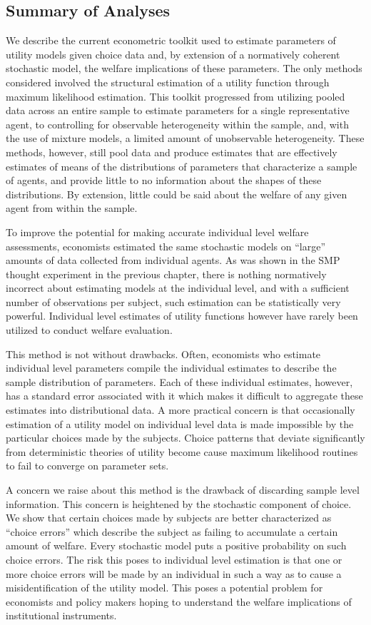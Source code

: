 \documentclass[../main.tex]{subfiles}
\begin{document}
\subsection{Summary of Analyses}

We describe the current econometric toolkit used to estimate parameters of utility models given choice data and, by extension of a normatively coherent stochastic model, the welfare implications of these parameters.
The only methods considered involved the structural estimation of a utility function through maximum likelihood estimation.
This toolkit progressed from utilizing pooled data across an entire sample to estimate parameters for a single representative agent, to controlling for observable heterogeneity within the sample, and, with the use of mixture models, a limited amount of unobservable heterogeneity.
These methods, however, still pool data and produce estimates that are effectively estimates of means of the distributions of parameters that characterize a sample of agents, and provide little to no information about the shapes of these distributions.
By extension, little could be said about the welfare of any given agent from within the sample.

To improve the potential for making accurate individual level welfare assessments, economists estimated the same stochastic models on \enquote{large} amounts of data collected from individual agents.
As was shown in the SMP thought experiment in the previous chapter, there is nothing normatively incorrect about estimating models at the individual level, and with a sufficient number of observations per subject, such estimation can be statistically very powerful.
Individual level estimates of utility functions however have rarely been utilized to conduct welfare evaluation.

This method is not without drawbacks.
Often, economists who estimate individual level parameters compile the individual estimates to describe the sample distribution of parameters.
Each of these individual estimates, however, has a standard error associated with it which makes it difficult to aggregate these estimates into distributional data.
A more practical concern is that occasionally estimation of a utility model on individual level data is made impossible by the particular choices made by the subjects.
Choice patterns that deviate significantly from deterministic theories of utility become cause maximum likelihood routines to fail to converge on parameter sets.

A concern we raise about this method is the drawback of discarding sample level information.
This concern is heightened by the stochastic component of choice.
We show that certain choices made by subjects are better characterized as \enquote{choice errors} which describe the subject as failing to accumulate a certain amount of welfare.
Every stochastic model puts a positive probability on such choice errors.
The risk this poses to individual level estimation is that one or more choice errors will be made by an individual in such a way as to cause a misidentification of the utility model.
This poses a potential problem for economists and policy makers hoping to understand the welfare implications of institutional instruments.
\end{document}
